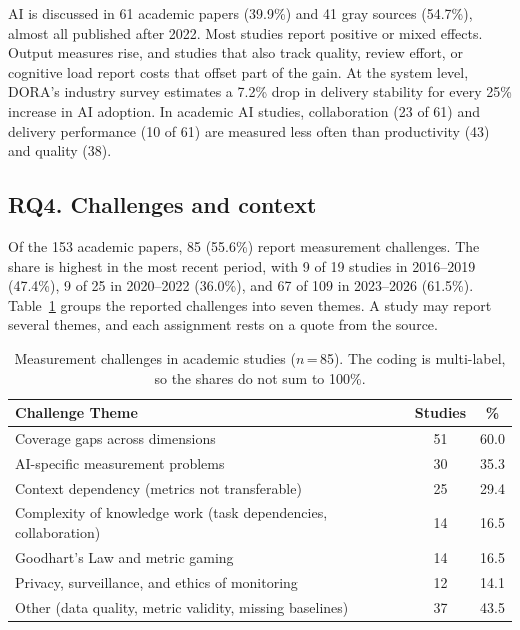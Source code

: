 \documentclass[preprint,number]{elsarticle}
\newcounter{study}
\begin{document}
\begin{tcolorbox}[colback=gray!5, colframe=gray!50, title={\textbf{Summary of RQ3}}, fonttitle=\small]
\footnotesize
AI is discussed in 61 academic papers (39.9\%) and 41 gray sources (54.7\%), almost all published after 2022. Most studies report positive or mixed effects. Output measures rise, and studies that also track quality, review effort, or cognitive load report costs that offset part of the gain. At the system level, DORA's industry survey estimates a 7.2\% drop in delivery stability for every 25\% increase in AI adoption. In academic AI studies, collaboration (23 of 61) and delivery performance (10 of 61) are measured less often than productivity (43) and quality (38).
\end{tcolorbox}

\subsection{RQ4. Challenges and context}
\label{sec:rq4}

Of the 153 academic papers, 85 (55.6\%) report measurement challenges. The share is highest in the most recent period, with 9 of 19 studies in 2016--2019 (47.4\%), 9 of 25 in 2020--2022 (36.0\%), and 67 of 109 in 2023--2026 (61.5\%).
Table~\ref{tab:challenges} groups the reported challenges into seven themes. A study may report several themes, and each assignment rests on a quote from the source.

\begin{table}[htbp]
\centering
\caption{Measurement challenges in academic studies ($n$\,=\,85). The coding is multi-label, so the shares do not sum to 100\%.}
\label{tab:challenges}
\footnotesize
\begin{tabular}{>{\raggedright\arraybackslash}p{4.6cm} c c}
\toprule
\textbf{Challenge Theme} & \textbf{Studies} & \textbf{\%} \\
\midrule
Coverage gaps across dimensions & 51 & 60.0 \\
AI-specific measurement problems & 30 & 35.3 \\
Context dependency (metrics not transferable) & 25 & 29.4 \\
Complexity of knowledge work (task dependencies, collaboration) & 14 & 16.5 \\
Goodhart's Law and metric gaming & 14 & 16.5 \\
Privacy, surveillance, and ethics of monitoring & 12 & 14.1 \\
Other (data quality, metric validity, missing baselines) & 37 & 43.5 \\
\bottomrule
\end{tabular}
\end{table}
\end{document}
